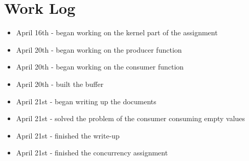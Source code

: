 \documentclass[draftclsnofoot,onecolumn,10pt,compsoc]{IEEEtran}
\begin{document}
\section{Work Log}
\begin{itemize}
	\item April 16th - began working on the kernel part of the assignment
	\item April 20th - began working on the producer function
	\item April 20th - began working on the consumer function
	\item April 20th - built the buffer
	\item April 21st - began writing up the documents
	\item April 21st - solved the problem of the consumer consuming empty values
	\item April 21st - finished the write-up
	\item April 21st - finished the concurrency assignment
\end{itemize}
\end{document}
